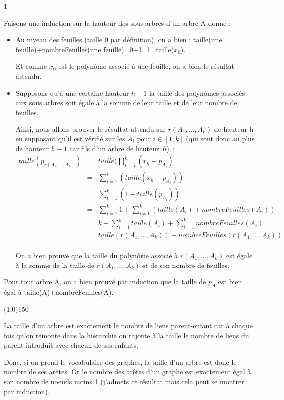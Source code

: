 1\documentclass[a4paper, 11pt,french]{article}
\begin{document}
Faisons une induction sur la hauteur  des sous-arbres d'un arbre A  donné : 
\begin{itemize}
\item Au niveau des feuilles (taille 0 par définition), on a bien : taille(une feuille)+nombreFeuilles(une feuille)=0+1=1=taille($x_0$).

  Et comme $x_0$ est le polynôme associé à une feuille, on a bien le résultat attendu.
\item Supposons qu'à une certaine hauteur $h-1$ la taille des polynômes associés aux sous arbres soit égale à la somme de leur taille et de leur nombre de feuilles.

  Ainsi, nous allons prouver le résultat attendu sur $r(A_1,\ldots,A_k)$ de hauteur h en supposant qu'il est vérifié sur les $A_i$  pour $i\in [1;k]$ (qui sont donc au plus de hauteur  $h-1$ car fils d'un arbre de hauteur~$h$)~:
  \begin{eqnarray*}
    taille(p_{r(A_1,\ldots,A_k)})&=& taille(\prod_{i=1}^k (x_h-p_{A_i})\\
    &=& \sum_{i=1}^k(taille(x_h-p_{A_i}))\\
    &=&\sum_{i=1}^k(1+taille(p_{A_i}))\\
    &=& \sum_{i=1}^k 1 +\sum_{i=1}^k (taille(A_i)+nombreFeuilles(A_i))\\
    &=& k+ \sum_{i=1}^ktaille(A_i)+\sum_{i=1}^k nombreFeuilles(A_i)\\
    &=& taille({r(A_1,\ldots,A_k)})+nombreFeuilles({r(A_1,\ldots,A_k)})\\
  \end{eqnarray*}

  On a bien prouvé que la taille du polynôme associé à  ${r(A_1,\ldots,A_k)}$ est égale à la somme de la taille de ${r(A_1,\ldots,A_k)}$ et de son nombre de feuilles. 
\end{itemize}

Pour tout arbre A, on a bien prouvé par induction que la taille de $p_A$ est bien égal à taille(A)+nombreFeuilles(A).

\begin{center}
  \line(1,0){150}
\end{center}

La taille d'un arbre est exactement le nombre de liens parent-enfant car à chaque fois qu'on remonte dans la hiérarchie on rajoute à la taille le nombre de liens du parent introduit avec chacun de ses enfants.

Donc, si on prend le vocabulaire des graphes, la taille d'un arbre est donc le nombre de ses arêtes. Or le nombre des arêtes d'un graphe est exactement égal à son nombre de noeuds moins 1 (j'admets ce résultat mais cela peut se montrer par induction).
\end{document}
